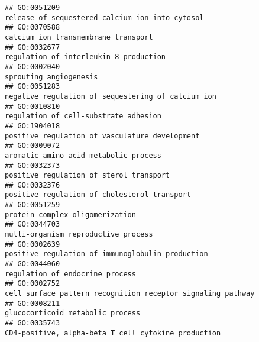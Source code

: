 \documentclass[
]{article}
\begin{document}
\begin{verbatim}
## GO:0051209                                                                                                  release of sequestered calcium ion into cytosol
## GO:0070588                                                                                                              calcium ion transmembrane transport
## GO:0032677                                                                                                           regulation of interleukin-8 production
## GO:0002040                                                                                                                           sprouting angiogenesis
## GO:0051283                                                                                               negative regulation of sequestering of calcium ion
## GO:0010810                                                                                                            regulation of cell-substrate adhesion
## GO:1904018                                                                                                   positive regulation of vasculature development
## GO:0009072                                                                                                            aromatic amino acid metabolic process
## GO:0032373                                                                                                          positive regulation of sterol transport
## GO:0032376                                                                                                     positive regulation of cholesterol transport
## GO:0051259                                                                                                                  protein complex oligomerization
## GO:0044703                                                                                                              multi-organism reproductive process
## GO:0002639                                                                                                 positive regulation of immunoglobulin production
## GO:0044060                                                                                                                  regulation of endocrine process
## GO:0002752                                                                                      cell surface pattern recognition receptor signaling pathway
## GO:0008211                                                                                                                 glucocorticoid metabolic process
## GO:0035743                                                                                              CD4-positive, alpha-beta T cell cytokine production

\end{verbatim}
\end{document}
